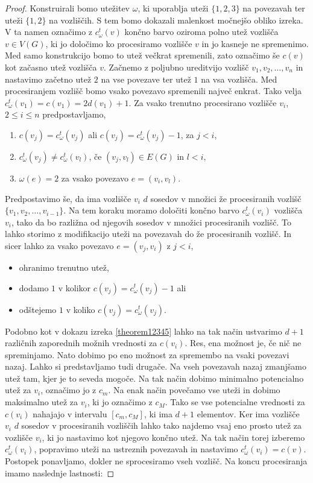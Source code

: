 \documentclass[12pt,a4paper,twoside]{article}
\theoremstyle{definition} %
\theoremstyle{plain} %
\numberwithin{equation}{section}  %
\begin{document}
\begin{proof}
Konstruirali bomo utežitev $\omega$, ki uporablja uteži $\{1,2,3\}$ na povezavah ter uteži $\{1,2\}$ na vozliščih. S tem bomo dokazali malenkost močnejšo obliko izreka. V ta namen označimo z $c_{\omega}^t(v)$ končno barvo oziroma polno utež vozlišča $v \in V(G)$, ki jo določimo ko procesiramo vozlišče $v$ in jo kasneje ne spremenimo. Med samo konstrukcijo bomo to utež večkrat spremenili, zato označimo še $c(v)$ kot začasno utež vozlišča $v$. Začnemo z poljubno ureditvijo vozlišč $v_1, v_2, \ldots, v_n$ in nastavimo začetno utež $2$ na vse povezave ter utež $1$ na vsa vozlišča. Med procesiranjem vozlišč bomo vsako povezavo spremenili največ enkrat. Tako velja $c_{\omega}^t(v_1) = c(v_1) = 2d(v_1) + 1$. Za vsako trenutno procesirano vozlišče $v_i$, $2\le i \le n$ predpostavljamo,
\begin{enumerate}
\item $c(v_j) = c_{\omega}^t(v_j) $ ali $c(v_j) = c_{\omega}^t(v_j)  - 1$, za $j < i$,
\item $c_{\omega}^t(v_j) \neq c_{\omega}^t(v_l)$, če $(v_j,v_l) \in E(G)$ in $l < i$,
\item $\omega(e) = 2$ za vsako povezavo $e = (v_i, v_l)$.
\end{enumerate}
Predpostavimo še, da ima vozlišče $v_i$ $d$ sosedov v množici že procesiranih vozlišč $\{v_1, v_2, \ldots, v_{i-1}\}$. Na tem koraku moramo določiti končno barvo $c_{\omega}^t(v_i)$ vozlišča $v_i$, tako da bo razližna od njegovih sosedov v množici procesiranih vozlišč. To lahko storimo z modifikacijo uteži na povezavah do že procesiranih vozlišč. In sicer lahko za vsako povezavo $e = (v_j, v_i)$ z $j < i$,
\begin{itemize}
\item ohranimo trenutno utež,
\item dodamo $1$ v kolikor $c(v_j) = c_{\omega}^t(v_j)   - 1$ ali
\item odštejemo $1$ v koliko $c(v_j) = c_{\omega}^t(v_j) $.
\end{itemize}
Podobno kot v dokazu izreka \ref{theorem12345} lahko na tak način ustvarimo $d+1$ različnih zaporednih možnih vrednosti za $c(v_i)$. Res, ena možnost je, če nič ne spreminjamo. Nato dobimo po eno možnost za spremembo na vsaki povezavi nazaj. Lahko si predstavljamo tudi drugače. Na vseh povezavah nazaj zmanjšamo utež tam, kjer je to seveda mogoče. Na tak način dobimo minimalno potencialno utež za $v_i$, označimo jo z  $c_m$. Na enak način povečamo vse uteži in dobimo maksimalno utež za $v_i$, ki jo označimo z $c_M$. Tako se vse potencialne vrednosti za $c(v_i)$ nahajajo v intervalu $[c_m, c_M]$, ki ima $d+1$ elementov. Ker ima vozlišče $v_i$ $d$ sosedov v procesiranih vozliščih lahko tako najdemo vsaj eno prosto utež za vozlišče $v_i$, ki jo nastavimo kot njegovo končno utež. Na tak način torej izberemo $c_{\omega}^t(v_i)$, popravimo uteži na ustreznih povezavah in nastavimo $c_{\omega}^t(v_i) = c(v)$. Postopek ponavljamo, dokler ne sprocesiramo vseh vozlišč. Na koncu procesiranja imamo naslednje lastnosti:

\end{proof}
\end{document}
